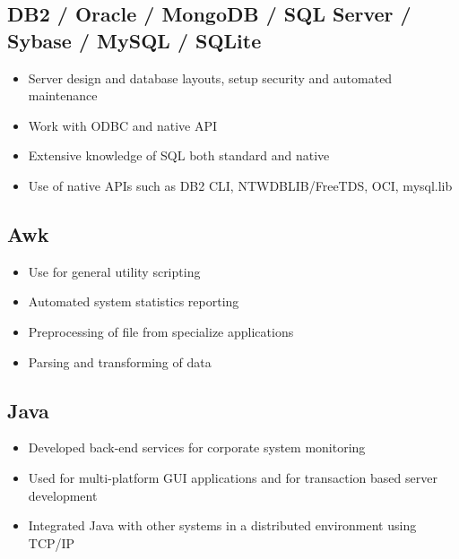 \documentclass[10pt]{report}
\begin{document}
\subsection*{DB2 / Oracle / MongoDB / SQL Server / Sybase / MySQL / SQLite}
\begin{itemize}
	\item Server design and database layouts, setup security and automated maintenance
	\item Work with ODBC and native API
	\item Extensive knowledge of SQL both standard and native
	\item Use of native APIs such as DB2 CLI, NTWDBLIB/FreeTDS, OCI, mysql.lib
\end{itemize}

\subsection*{Awk}
\begin{itemize}
	\item Use for general utility scripting 
	\item Automated system statistics reporting
	\item Preprocessing of file from specialize applications
	\item Parsing and transforming of data
\end{itemize}


\subsection*{Java}
\begin{itemize}
\item Developed back-end services for corporate system monitoring
\item Used for multi-platform GUI applications and for transaction based server development
\item Integrated Java with other systems in a distributed environment using TCP/IP
\end{itemize}

\end{document}
